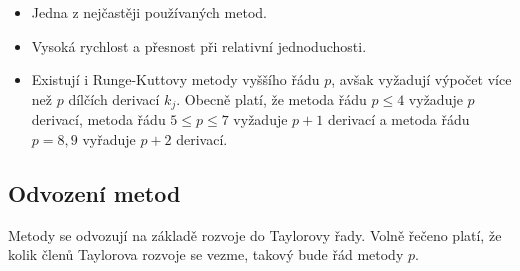 \documentclass[a4paper,11pt,twoside]{article}
\theoremstyle{red}
\theoremstyle{green}
\begin{document}
    \begin{itemize}
        \item Jedna z nejčastěji používaných metod.
        \item Vysoká rychlost a přesnost při relativní jednoduchosti.
        \item Existují i Runge-Kuttovy metody vyššího řádu $p$, avšak vyžadují výpočet více než $p$ dílčích derivací $k_{j}$.
        Obecně platí, že metoda řádu $p\leq4$ vyžaduje $p$ derivací, metoda řádu $5\leq p\leq7$ vyžaduje $p+1$ derivací a metoda řádu $p=8,9$ vyřaduje $p+2$ derivací.
    \end{itemize}

\subsection{Odvození metod}
    Metody se odvozují na základě rozvoje do Taylorovy řady.
    Volně řečeno platí, že kolik členů Taylorova rozvoje se vezme, takový bude řád metody $p$.
\end{document}

